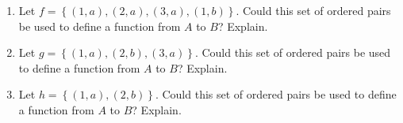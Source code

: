 \begin{previewactivity}
\setcounter{oldenumi}{\theenumi}
\begin{enumerate} \setcounter{enumi}{\theoldenumi}
\item Let  $f = \left\{ {( {1, a} ), ( {2, a} ), ( {3, a} ), ( {1, b} )} \right\}$. Could this set of ordered pairs be used to define a function from  $A$  to  $B$?  Explain.

\item Let $g = \left\{ {( {1, a} ), ( {2, b} ), ( {3, a} )} \right\}$.  Could this set of ordered pairs be used to define a function from  $A$  to  $B$?  Explain.

\item Let $h = \left\{ {( {1, a} ), ( {2, b} )} \right\}$.  Could this set of ordered pairs be used to define a function from  $A$  to  $B$?  Explain.
\end{enumerate}
\hbreak

\end{previewactivity}


\endinput

